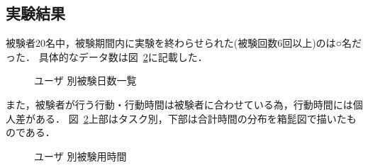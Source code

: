 \subsection{実験結果}
被験者20名中，被験期間内に実験を終わらせられた(被験回数6回以上)のは○名だった．
具体的なデータ数は図~\ref{fig:day}に記載した．
\begin{figure}[hb]
	\begin{center}
		\caption{ユーザ 別被験日数一覧}
		\label{fig:day}
	\end{center}
\end{figure}

また，被験者が行う行動・行動時間は被験者に合わせている為，行動時間には個人差がある．
図~\ref{fig:day}上部はタスク別，下部は合計時間の分布を箱髭図で描いたものである．
\begin{figure}[hb]
	\begin{center}
		\caption{ユーザ 別被験用時間}
		\label{fig:day}
	\end{center}
\end{figure}


